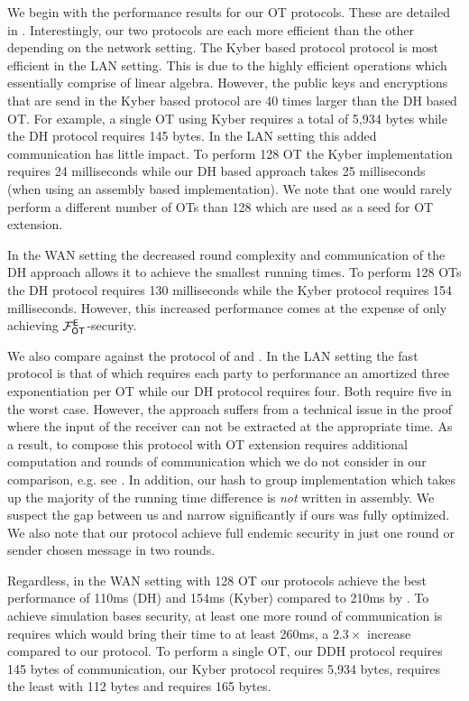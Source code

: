 We begin with the performance results for our OT protocols. These are detailed in . Interestingly, our two protocols are each more efficient than the other depending on the network setting. The Kyber based protocol protocol is most efficient in the LAN setting. This is due to the highly efficient operations which essentially comprise of linear algebra. However, the public keys and encryptions that are send in the Kyber based protocol are 40 times larger than the DH based OT. For example, a single OT using Kyber requires a total of 5,934 bytes while the DH protocol requires 145 bytes. In the LAN setting this added communication has little impact. To perform 128 OT the Kyber implementation requires 24 milliseconds while our DH based approach takes 25 milliseconds (when using an assembly based implementation). We note that one would rarely perform a different number of OTs than 128 which are used as a seed for OT extension.

In the WAN setting the decreased round complexity and communication of the DH approach allows it to achieve the smallest running times. To perform 128 OTs the DH protocol requires 130 milliseconds while the Kyber protocol requires 154 milliseconds. However, this increased performance comes at the expense of only achieving $\mathcal{F}_{\mathsf{OT}}^\mathsf{E}$-security. 

We also compare against the protocol of \cite{LC:ChoOrl15} and \cite{SODA:NaoPin01}. In the LAN setting the fast protocol is that of  \cite{LC:ChoOrl15} which requires each party to performance an amortized three exponentiation per OT while our DH protocol requires four. Both require five in the worst case. However, the \cite{LC:ChoOrl15} approach suffers from a technical issue in the proof where the input of the receiver can not be extracted at the appropriate time. As a result, to compose this protocol with OT extension requires additional computation and rounds of communication which we do not consider in our comparison, e.g. see \cite[Appendix A]{SP:DKLS18}. In addition, our hash to group implementation which takes up the majority of the running time difference is \emph{not} written in assembly. We suspect the gap between us and \cite{LC:ChoOrl15} narrow significantly if ours was fully optimized. We also note that our protocol achieve full endemic security in just one round or sender chosen message in two rounds. 

Regardless, in the WAN setting with 128 OT our protocols achieve the best performance of 110ms (DH) and 154ms (Kyber) compared to 210ms by  \cite{LC:ChoOrl15}. To achieve simulation bases security, at least one more round of communication is requires which would bring their time to at least 260ms, a $2.3\times$ increase compared to our protocol. To perform a single OT, our DDH protocol requires 145 bytes of communication, our Kyber protocol requires 5,934 bytes, \cite{LC:ChoOrl15} requires  the least with 112 bytes and \cite{SODA:NaoPin01} requires 165 bytes.


